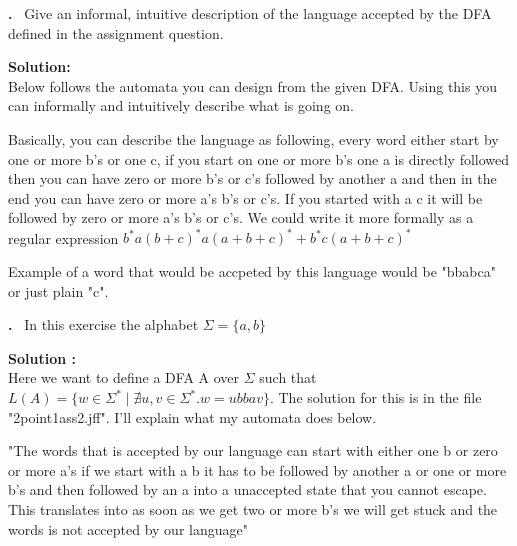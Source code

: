 \documentclass{article}
\newcounter{problem}
\newcounter{solution}
\newcommand\Problem{%
  \stepcounter{problem}%
  \textbf{\theproblem.}~%
  \setcounter{solution}{0}%
}
\newcommand\TheSolution{%
  \textbf{Solution:}\\%
}
\newcommand\ASolution{%
  \stepcounter{solution}%
  \textbf{Solution \thesolution:}\\%
}
\begin{document}
\begin{center}
\end{center}

\Problem Give an informal, intuitive description of the language accepted by the DFA defined in the assignment question.

\TheSolution Below follows the automata you can design from the given DFA. Using this you can informally and intuitively describe what is going on. 

\begin{center}
\end{center}

Basically, you can describe the language as following, every word either
start by one or more b's or one c, if you start on one or more b's one a is 
directly followed then you can have zero or more b's or c's followed by another
a and then in the end you can have zero or more a's b's or c's. If you started 
with a c it will be followed by zero or more a's b's or c's. We could write it more 
formally as a regular expression \textbf{$b^*a(b+c)^*a(a+b+c)^* + b^*c(a+b+c)^*$}

Example of a word that would be accpeted by this language would be "bbabca" or just 
plain "c".

\newpage
\Problem In this exercise the alphabet $\Sigma = \{a,b\}$

\ASolution Here we want to define a DFA A over $\Sigma$ such that $L(A) = \{w \in \Sigma^* \mid \nexists u,v \in \Sigma^*. w = ubbav \}$. The solution for this is in the file "2point1ass2.jff". I'll explain what my automata does below.

\begin{center}
    "The words that is accepted by our language can start with 
    either one b or zero or more a's if we start with a b it 
    has to be followed by another a or one or more b's and then 
    followed by an a into a unaccepted state that you cannot 
    escape. This translates into as soon as we get two or more 
    b's we will get stuck and the words is not accepted by our language"
\end{center}
\end{document}
